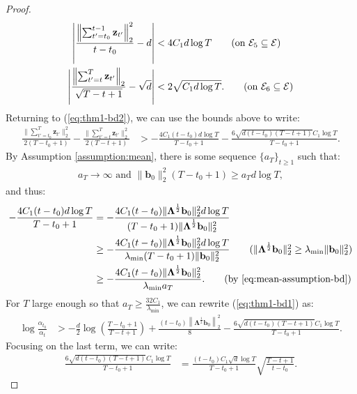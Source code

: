 \begin{proof}
\begin{align*}
    \left|\frac{\left\lVert\sum_{t'=t_0}^{t-1}\mathbf{z}_{t'}\right\rVert_2^2}{t-t_0} - d\right| &< 4C_1d\log T \tag{on $\mathcal{E}_5\subseteq\mathcal{E}$} \\
    \left|\frac{\left\lVert\sum_{t'=t}^{T}\mathbf{z}_{t'}\right\rVert_2}{\sqrt{T-t+1}} -\sqrt{d}\right| &< 2\sqrt{C_1 d\log T}. \tag{on $\mathcal{E}_6\subseteq\mathcal{E}$}
\end{align*}
Returning to (\ref{eq:thm1-bd2}), we can use the bounds above to write:
\begin{align*}
    \frac{\lVert\sum_{t'=t_0}^T\mathbf{z}_{t'}\rVert_2^2}{2(T-t_0+1)} - \frac{\lVert\sum_{t'=t}^T\mathbf{z}_{t'}\rVert_2^2}{2(T-t+1)} &> -\frac{4C_1(t-t_0)d\log T}{T-t_0+1} - \frac{6\sqrt{d(t-t_0)(T-t+1)}C_1\log T}{T-t_0+1}.
\end{align*} 
By Assumption \ref{assumption:mean}, there is some sequence $\{a_T\}_{t \geq 1}$ such that: 
\begin{align}
    a_T\to\infty \text{ and } \lVert \mathbf{b}_0\rVert_2^2(T-t_0+1)\geq a_Td\log T, \label{eq:mean-assumption-bd}
\end{align}
and thus:
\begin{align*}
    -\frac{4C_1(t-t_0)d\log T}{T-t_0+1} &= -\frac{4C_1(t-t_0)\lVert\boldsymbol{\Lambda}^{\frac{1}{2}}\mathbf{b}_0\rVert_2^2d\log T}{(T-t_0+1)\lVert\boldsymbol{\Lambda}^{\frac{1}{2}}\mathbf{b}_0\rVert_2^2} \\
    &\geq -\frac{4C_1(t-t_0)\lVert\boldsymbol{\Lambda}^{\frac{1}{2}}\mathbf{b}_0\rVert_2^2d\log T}{\lambda_{\min}(T-t_0+1)\lVert\mathbf{b}_0\rVert_2^2} \tag{$\lVert\boldsymbol{\Lambda}^{\frac{1}{2}}\mathbf{b}_0\rVert_2^2\geq\lambda_{\min} \lVert\mathbf{b}_0\rVert_2^2$} \\
    &\geq -\frac{4C_1(t-t_0)\lVert\boldsymbol{\Lambda}^{\frac{1}{2}}\mathbf{b}_0\rVert_2^2}{\lambda_{\min} a_T}. \tag{by \ref{eq:mean-assumption-bd}}
\end{align*}
For $T$ large enough so that $a_T \geq \frac{32C_1}{\lambda_{\min}}$, we can rewrite (\ref{eq:thm1-bd1}) as: 
\begin{align}
    \log \frac{\alpha_{t_0}}{\alpha_t} &> -\frac{d}{2}\log\left(\frac{T-t_0+1}{T-t+1}\right) +\frac{(t-t_0)\left\lVert\boldsymbol{\Lambda}^{\frac{1}{2}}\mathbf{b}_0\right\rVert_2^2}{8} - \frac{6\sqrt{d(t-t_0)(T-t+1)}C_1\log T}{T-t_0+1}.\label{eq:thm1-bd3}
\end{align}
Focusing on the last term, we can write:
\begin{align*}
    \frac{6\sqrt{d(t-t_0)(T-t+1)}C_1\log T}{T-t_0+1} &= \frac{(t-t_0)C_1\sqrt{d}\log T}{T-t_0+1}\sqrt{\frac{T-t+1}{t-t_0}}.

\end{align*}
\end{proof}
